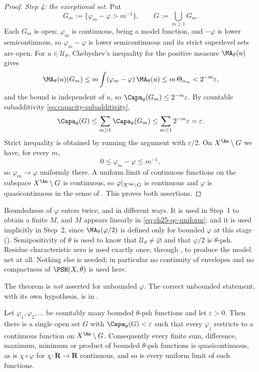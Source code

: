 \begin{proof}
\emph{Step 4: the exceptional set.}  Put
\[
 G_m:=\bigl\{\varphi_m-\varphi>m^{-1}\bigr\},
 \qquad
 G:=\bigcup_{m\geq1}G_m .
\]
Each \(G_m\) is open: \(\varphi_m\) is continuous, being a model function,
and \(-\varphi\) is lower semicontinuous, so \(\varphi_m-\varphi\) is lower
semicontinuous and its strict superlevel sets are open.  For
\(u\in\mathcal U_\theta\), Chebyshev's inequality for the positive measure
\(\MA_\theta(u)\) gives
\[
 \MA_\theta(u)(G_m)
 \leq m\int(\varphi_m-\varphi)\,\MA_\theta(u)
 \leq m\,\Theta_{\alpha_m}<2^{-m}\varepsilon ,
\]
and the bound is independent of \(u\), so
\(\Capa_\theta(G_m)\leq2^{-m}\varepsilon\).  By countable subadditivity
\eqref{eq:capacity-subadditivity},
\[
 \Capa_\theta(G)\leq\sum_{m\geq1}\Capa_\theta(G_m)
 \leq\sum_{m\geq1}2^{-m}\varepsilon=\varepsilon .
\]
Strict inequality is obtained by running the argument with
\(\varepsilon/2\).  On \(X^{\An}\setminus G\) we have, for every \(m\),
\[
        0\leq\varphi_m-\varphi\leq m^{-1},
\]
so \(\varphi_m\to\varphi\) uniformly there.  A uniform limit of continuous
functions on the subspace \(X^{\An}\setminus G\) is continuous, so
\(\varphi|_{X^{\An}\setminus G}\) is continuous and \(\varphi\) is
quasicontinuous in the sense of
.  This proves both assertions.
\end{proof}

\begin{remark}
\label{rem:ch25-qc-hypotheses}
Boundedness of \(\varphi\) enters twice, and in different ways.  It is used
in Step~1 to obtain a finite \(M\), and \(M\) appears linearly in
\eqref{eq:ch25-qc-uniform}; and it is used implicitly in Step~2, since
\(\MA_\theta(\varphi/2)\) is defined only for bounded \(\varphi\) at this
stage ().  Semipositivity of \(\theta\) is
used to know that \(\mathcal U_\theta\neq\varnothing\) and that
\(\varphi/2\) is \(\theta\)-psh.  Residue characteristic zero is used exactly
once, through , to produce the model
net at all.  Nothing else is needed; in particular no continuity of
envelopes and no compactness of \(\PSH(X,\theta)\) is used here.

The theorem is \emph{not} asserted for unbounded \(\varphi\).  The correct
unbounded statement, with its own hypothesis, is
 in .
\end{remark}

\begin{corollary}
\label{cor:ch25-quasicontinuity-calculus}
Let \(\varphi_1,\varphi_2,\ldots\) be countably many bounded \(\theta\)-psh
functions and let \(\varepsilon>0\).  Then there is a single open set \(G\)
with \(\Capa_\theta(G)<\varepsilon\) such that every \(\varphi_j\) restricts
to a continuous function on \(X^{\An}\setminus G\).  Consequently every
finite sum, difference, maximum, minimum or product of bounded
\(\theta\)-psh functions is quasicontinuous, as is \(\chi\circ\varphi\) for
\(\chi:\mathbf R\to\mathbf R\) continuous, and so is every uniform limit of
such functions.
\end{corollary}

